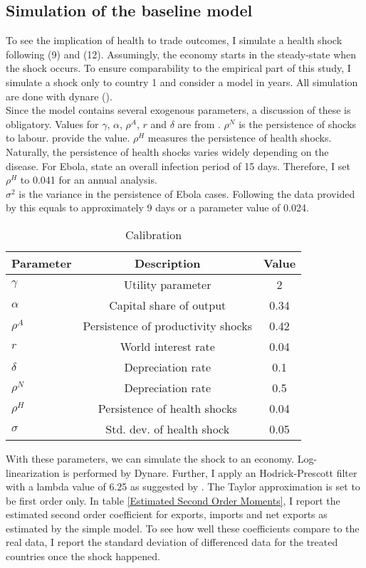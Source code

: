 \documentclass{article}
\begin{document}
\subsection{Simulation of the baseline model}
To see the implication of health to trade outcomes, I simulate a health shock following (9) and (12). Assumingly, the economy starts in the steady-state when the shock occurs. To ensure comparability to the empirical part of this study, I simulate a shock only to country 1 and consider a model in years. All simulation are done with dynare (\cite{adjemian2011dynare}).\\
Since the model contains several exogenous parameters, a discussion of these is obligatory. Values for $\gamma$, $\alpha$, $\rho^{A}$, $r$ and $\delta$ are from \cite{schmitt2003closing}. $\rho^N$ is the persistence of shocks to labour. \cite{smets2007shocks} provide the value. $\rho^H$ measures the persistence of health shocks. Naturally, the persistence of health shocks varies widely depending on the disease. For Ebola, \cite{fisman2014early} state an overall infection period of 15 days. Therefore, I set $\rho^H$ to 0.041 for an annual analysis.\\
$\sigma^{2}$ is the variance in the persistence of Ebola cases. Following the data provided by \cite{fisman2014early} this equals to approximately 9 days or a parameter value of 0.024.

\begin{table}[htbp]\centering \caption{Calibration \label{Calibration}}
\begin{tabular}{l c c}\hline\hline
Parameter & Description & Value \\ \hline
$\gamma$ & Utility parameter & 2 \\
$\alpha$ & Capital share of output & 0.34 \\
$\rho^A$ & Persistence of productivity shocks & 0.42 \\
$r$ & World interest rate & 0.04 \\
$\delta$ & Depreciation rate & 0.1 \\
$\rho^N$ & Depreciation rate & 0.5 \\
$\rho^H$ & Persistence of health shocks & 0.04 \\
$\sigma$ & Std. dev. of health shock & 0.05 \\ \hline
\end{tabular}
\end{table}

With these parameters, we can simulate the shock to an economy. Log-linearization is performed by Dynare. Further, I apply an Hodrick-Prescott filter with a lambda value of 6.25 as suggested by \cite{ravn2002adjusting}. The Taylor approximation is set to be first order only. In table \ref{Estimated Second Order Moments}, I report the estimated second order coefficient for exports, imports and net exports as estimated by the simple model. To see how well these coefficients compare to the real data, I report the standard deviation of differenced data for the treated countries once the shock happened. 
\end{document}
